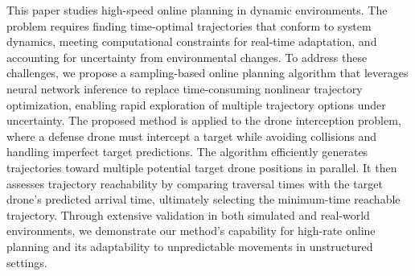 This paper studies high-speed online planning in dynamic environments. 
The problem requires finding time-optimal trajectories that conform to system dynamics, meeting computational constraints for real-time adaptation, and accounting for uncertainty from environmental changes.
To address these challenges, we propose a sampling-based online planning algorithm that leverages neural network inference to replace time-consuming nonlinear trajectory optimization, enabling rapid exploration of multiple trajectory options under uncertainty.
The proposed method is applied to the drone interception problem, where a defense drone must intercept a target while avoiding collisions and handling imperfect target predictions. 
The algorithm efficiently generates trajectories toward multiple potential target drone positions in parallel. 
It then assesses trajectory reachability by comparing traversal times with the target drone's predicted arrival time, ultimately selecting the minimum-time reachable trajectory. 
Through extensive validation in both simulated and real-world environments, we demonstrate our method's capability for high-rate online planning and its adaptability to unpredictable movements in unstructured settings.